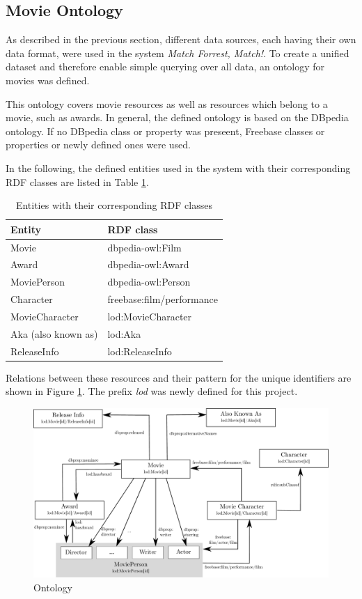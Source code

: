 \subsection{Movie Ontology}
\label{subsec_method_ontology}

As described in the previous section, different data sources, each having their own data format, were used in the system \emph{Match Forrest, Match!}.
To create a unified dataset and therefore enable simple querying over all data, an ontology for movies was defined.

This ontology covers movie resources as well as resources which belong to a movie, such as awards.
In general, the defined ontology is based on the DBpedia ontology.
If no DBpedia class or property was preseent, Freebase classes or properties or newly defined ones were used.

In the following, the defined entities used in the system with their corresponding RDF classes are listed in Table \ref{tab_entities}.

\begin{table}[ht]
	\begin{center}
	\begin{tabular}{ll}
		\textbf{Entity} & \textbf{RDF class} \\ \hline
		Movie & dbpedia-owl:Film \\
		Award & dbpedia-owl:Award \\
		MoviePerson & dbpedia-owl:Person \\
		Character & freebase:film/performance \\
		MovieCharacter & lod:MovieCharacter \\
		Aka (also known as) & lod:Aka \\
		ReleaseInfo & lod:ReleaseInfo \\
	\end{tabular}
	\end{center}
	\caption{Entities with their corresponding RDF classes}
	\label{tab_entities}
\end{table}

Relations between these resources and their pattern for the unique identifiers are shown in Figure \ref{fig_ontology}.
The prefix \textit{lod} was newly defined for this project.

\begin{figure}[h!]
\includegraphics[width=\textwidth]{images/ontology.pdf}
\caption{Ontology}
\label{fig_ontology}
\end{figure}


